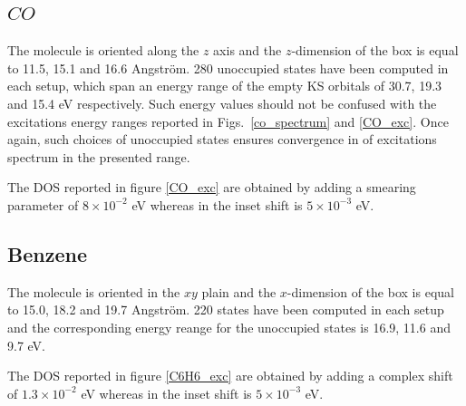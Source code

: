 \documentclass[reprint,aps,prb]{revtex4-1}
\renewcommand{\AA}{{Angstr\"om}}
\begin{document}
\subsection{$CO$}
The molecule is oriented along the $z$ axis and the $z$-dimension of the box is equal to 11.5, 15.1 and 16.6 \AA.
280 unoccupied states have been computed in each setup, which span an energy range of the empty KS orbitals of 30.7, 19.3 and 15.4 eV respectively.
Such energy values should not be confused with the excitations energy ranges reported in Figs.~\ref{co_spectrum} and \ref{CO_exc}.
Once again, such choices of unoccupied states ensures convergence in of excitations spectrum in the presented range.

The DOS reported in figure \ref{CO_exc} are obtained by adding a smearing parameter of $8\times 10^{-2}$ eV whereas in the inset shift is $5\times 10^{-3}$ eV.

\subsection{Benzene}
The molecule is oriented in the $xy$ plain and the $x$-dimension of the box is equal to 15.0, 18.2 and 19.7 \AA.
220 states have been computed in each setup and the corresponding
energy reange for the unoccupied states is 16.9, 11.6 and 9.7 eV.

The DOS reported in figure \ref{C6H6_exc} are obtained by adding a complex shift of $1.3\times 10^{-2}$ eV whereas in the inset shift is $5\times 10^{-3}$ eV.



%

\end{document}
